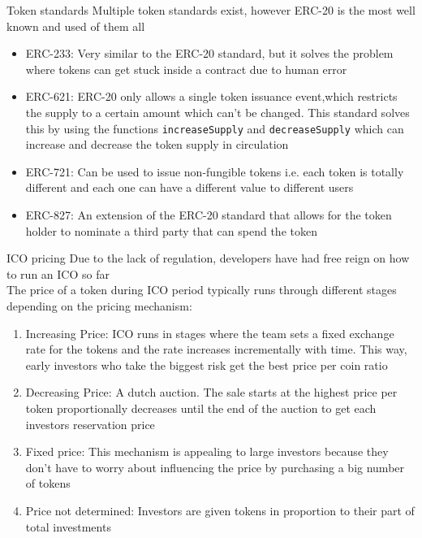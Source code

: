 \documentclass[11pt]{beamer}
\begin{document}
\begin{frame}{Token standards}
	Multiple token standards exist, however ERC-20 is the most well known and used of them all
	\begin{itemize}
		\item ERC-233: Very similar to the ERC-20 standard, but it solves the problem where tokens can get stuck inside a contract due to human error
		\item ERC-621: ERC-20 only allows a single token issuance event,which restricts the supply to a certain amount which can't be changed. This standard solves this by using the functions \texttt{increaseSupply} and \texttt{decreaseSupply} which can increase and decrease the token supply in circulation
		\item ERC-721: Can be used to issue non-fungible tokens i.e. each token is totally different and each one can have a different value to different users
		\item ERC-827: An extension of the ERC-20 standard that allows for the token holder to nominate a third party that can spend the token
	\end{itemize}
\end{frame}



\begin{frame}{ICO pricing}
	Due to the lack of regulation, developers have had free reign on how to run an ICO so far\\ \vspace{3mm}
	The price of a token during ICO period typically runs through different stages depending on the pricing mechanism:
	\begin{small}
		\begin{enumerate}
			\item Increasing Price: ICO runs in stages where the team sets a fixed exchange rate for the tokens and the rate increases incrementally with time. This way, early investors who take the biggest risk get the best price per coin ratio
			\item Decreasing Price: A dutch auction. The sale starts at the highest price per token proportionally decreases until the end of the auction to get each investors reservation price
			\item Fixed price: This mechanism is appealing to large investors because they don't have to worry about influencing the price by purchasing a big number of tokens
			\item Price not determined: Investors are given tokens in proportion to their part of total investments
		\end{enumerate}
	\end{small}
\end{frame}
\end{document}
